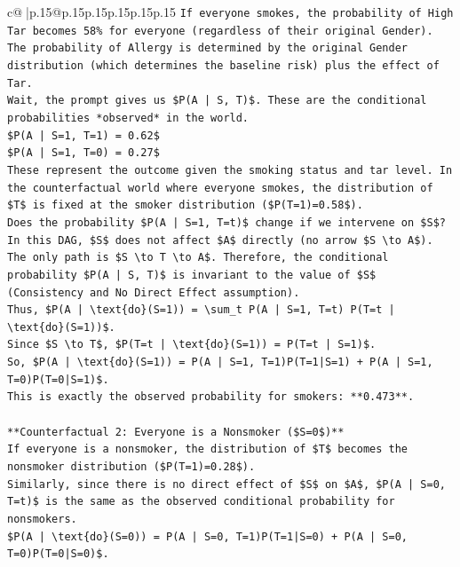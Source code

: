 \documentclass{article}
\begin{document}
{\begin{supertabular}{c@{$\;$}|p{.15\linewidth}@{}p{.15\linewidth}p{.15\linewidth}p{.15\linewidth}p{.15\linewidth}p{.15\linewidth}}
{{{\texttt{If everyone smokes, the probability of High Tar becomes 58\% for everyone (regardless of their original Gender).} \\
\texttt{The probability of Allergy is determined by the original Gender distribution (which determines the baseline risk) plus the effect of Tar.} \\
\texttt{Wait, the prompt gives us \$P(A | S, T)\$. These are the conditional probabilities *observed* in the world.} \\
\texttt{\$P(A | S=1, T=1) = 0.62\$} \\
\texttt{\$P(A | S=1, T=0) = 0.27\$} \\
\texttt{These represent the outcome given the smoking status and tar level. In the counterfactual world where everyone smokes, the distribution of \$T\$ is fixed at the smoker distribution (\$P(T=1)=0.58\$).} \\
\texttt{Does the probability \$P(A | S=1, T=t)\$ change if we intervene on \$S\$?} \\
\texttt{In this DAG, \$S\$ does not affect \$A\$ directly (no arrow \$S \textbackslash{}to A\$). The only path is \$S \textbackslash{}to T \textbackslash{}to A\$. Therefore, the conditional probability \$P(A | S, T)\$ is invariant to the value of \$S\$ (Consistency and No Direct Effect assumption).} \\
\texttt{Thus, \$P(A | \textbackslash{}text\{do\}(S=1)) = \textbackslash{}sum\_t P(A | S=1, T=t) P(T=t | \textbackslash{}text\{do\}(S=1))\$.} \\
\texttt{Since \$S \textbackslash{}to T\$, \$P(T=t | \textbackslash{}text\{do\}(S=1)) = P(T=t | S=1)\$.} \\
\texttt{So, \$P(A | \textbackslash{}text\{do\}(S=1)) = P(A | S=1, T=1)P(T=1|S=1) + P(A | S=1, T=0)P(T=0|S=1)\$.} \\
\texttt{This is exactly the observed probability for smokers: **0.473**.} \\
\\ 
\texttt{**Counterfactual 2: Everyone is a Nonsmoker (\$S=0\$)**} \\
\texttt{If everyone is a nonsmoker, the distribution of \$T\$ becomes the nonsmoker distribution (\$P(T=1)=0.28\$).} \\
\texttt{Similarly, since there is no direct effect of \$S\$ on \$A\$, \$P(A | S=0, T=t)\$ is the same as the observed conditional probability for nonsmokers.} \\
\texttt{\$P(A | \textbackslash{}text\{do\}(S=0)) = P(A | S=0, T=1)P(T=1|S=0) + P(A | S=0, T=0)P(T=0|S=0)\$.} \\
}}}
\end{supertabular}}
\end{document}
